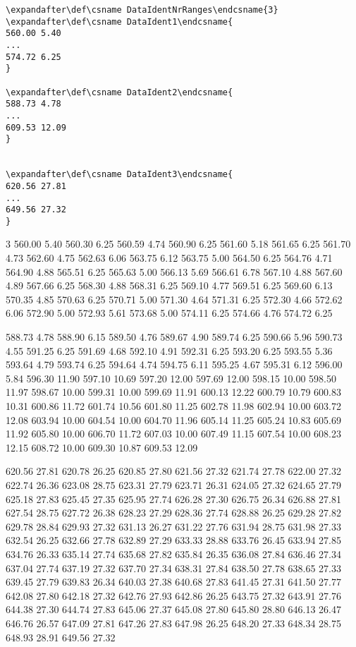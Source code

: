 \begin{verbatim}
\expandafter\def\csname DataIdentNrRanges\endcsname{3}
\expandafter\def\csname DataIdent1\endcsname{
560.00 5.40
...
574.72 6.25
}

\expandafter\def\csname DataIdent2\endcsname{
588.73 4.78
...
609.53 12.09
}


\expandafter\def\csname DataIdent3\endcsname{
620.56 27.81
...
649.56 27.32
}
\end{verbatim}


\expandafter\def\csname DataIdentNrRanges\endcsname{3}
\expandafter\def\csname DataIdent1\endcsname{
560.00 5.40
560.30 6.25
560.59 4.74
560.90 6.25
561.60 5.18
561.65 6.25
561.70 4.73
562.60 4.75
562.63 6.06
563.75 6.12
563.75 5.00
564.50 6.25
564.76 4.71
564.90 4.88
565.51 6.25
565.63 5.00
566.13 5.69
566.61 6.78
567.10 4.88
567.60 4.89
567.66 6.25
568.30 4.88
568.31 6.25
569.10 4.77
569.51 6.25
569.60 6.13
570.35 4.85
570.63 6.25
570.71 5.00
571.30 4.64
571.31 6.25
572.30 4.66
572.62 6.06
572.90 5.00
572.93 5.61
573.68 5.00
574.11 6.25
574.66 4.76
574.72 6.25
}

\expandafter\def\csname DataIdent2\endcsname{
588.73 4.78
588.90 6.15
589.50 4.76
589.67 4.90
589.74 6.25
590.66 5.96
590.73 4.55
591.25 6.25
591.69 4.68
592.10 4.91
592.31 6.25
593.20 6.25
593.55 5.36
593.64 4.79
593.74 6.25
594.64 4.74
594.75 6.11
595.25 4.67
595.31 6.12
596.00 5.84
596.30 11.90
597.10 10.69
597.20 12.00
597.69 12.00
598.15 10.00
598.50 11.97
598.67 10.00
599.31 10.00
599.69 11.91
600.13 12.22
600.79 10.79
600.83 10.31
600.86 11.72
601.74 10.56
601.80 11.25
602.78 11.98
602.94 10.00
603.72 12.08
603.94 10.00
604.54 10.00
604.70 11.96
605.14 11.25
605.24 10.83
605.69 11.92
605.80 10.00
606.70 11.72
607.03 10.00
607.49 11.15
607.54 10.00
608.23 12.15
608.72 10.00
609.30 10.87
609.53 12.09
}

\expandafter\def\csname DataIdent3\endcsname{
620.56 27.81
620.78 26.25
620.85 27.80
621.56 27.32
621.74 27.78
622.00 27.32
622.74 26.36
623.08 28.75
623.31 27.79
623.71 26.31
624.05 27.32
624.65 27.79
625.18 27.83
625.45 27.35
625.95 27.74
626.28 27.30
626.75 26.34
626.88 27.81
627.54 28.75
627.72 26.38
628.23 27.29
628.36 27.74
628.88 26.25
629.28 27.82
629.78 28.84
629.93 27.32
631.13 26.27
631.22 27.76
631.94 28.75
631.98 27.33
632.54 26.25
632.66 27.78
632.89 27.29
633.33 28.88
633.76 26.45
633.94 27.85
634.76 26.33
635.14 27.74
635.68 27.82
635.84 26.35
636.08 27.84
636.46 27.34
637.04 27.74
637.19 27.32
637.70 27.34
638.31 27.84
638.50 27.78
638.65 27.33
639.45 27.79
639.83 26.34
640.03 27.38
640.68 27.83
641.45 27.31
641.50 27.77
642.08 27.80
642.18 27.32
642.76 27.93
642.86 26.25
643.75 27.32
643.91 27.76
644.38 27.30
644.74 27.83
645.06 27.37
645.08 27.80
645.80 28.80
646.13 26.47
646.76 26.57
647.09 27.81
647.26 27.83
647.98 26.25
648.20 27.33
648.34 28.75
648.93 28.91
649.56 27.32
}

